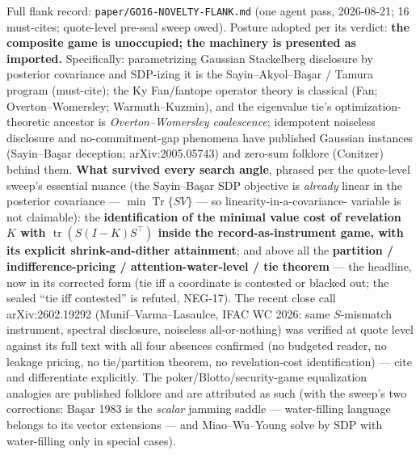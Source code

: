 \documentclass[11pt]{article}
\theoremstyle{definition}
\newcommand{\tr}{\operatorname{tr}}
\begin{document}
Full flank record: \texttt{paper/GO16-NOVELTY-FLANK.md} (one agent
pass, 2026-08-21; 16 must-cites; quote-level pre-seal sweep owed).
Posture adopted per its verdict: \textbf{the composite game is
unoccupied; the machinery is presented as imported.} Specifically:
parametrizing Gaussian Stackelberg disclosure by posterior
covariance and SDP-izing it is the Sayin--Akyol--Ba\c{s}ar / Tamura
program (must-cite); the Ky Fan/fantope operator theory is classical
(Fan; Overton--Womersley; Warmuth--Kuzmin), and the eigenvalue tie's
optimization-theoretic ancestor is \emph{Overton--Womersley
coalescence}; idempotent noiseless disclosure and no-commitment-gap
phenomena have published Gaussian instances (Sayin--Ba\c{s}ar
deception; arXiv:2005.05743) and zero-sum folklore (Conitzer)
behind them. \textbf{What survived every search angle}, phrased per the
quote-level sweep's essential nuance (the Sayin--Ba\c{s}ar SDP
objective is \emph{already} linear in the posterior covariance ---
$\min \operatorname{Tr}\{SV\}$ --- so linearity-in-a-covariance-%
variable is not claimable): the \textbf{identification of the
minimal value cost of revelation $K$ with $\tr(S(I-K)S^\top)$
inside the record-as-instrument game, with its explicit
shrink-and-dither attainment}; and above all the \textbf{partition /
indifference-pricing / attention-water-level / tie theorem} --- the
headline, now in its corrected form (tie iff a coordinate is contested
or blacked out; the sealed ``tie iff contested'' is refuted, NEG-17).
The recent close call arXiv:2602.19292
(Munif--Varma--Lasaulce, IFAC WC 2026: same $S$-mismatch instrument,
spectral disclosure, noiseless all-or-nothing) was verified at
quote level against its full text with all four absences confirmed
(no budgeted reader, no leakage pricing, no tie/partition theorem,
no revelation-cost identification) --- cite and differentiate
explicitly. The poker/Blotto/security-game equalization analogies
are published folklore and are attributed as such (with the sweep's
two corrections: Ba\c{s}ar 1983 is the \emph{scalar} jamming saddle
--- water-filling language belongs to its vector extensions --- and
Miao--Wu--Young solve by SDP with water-filling only in special
cases).
\end{document}

